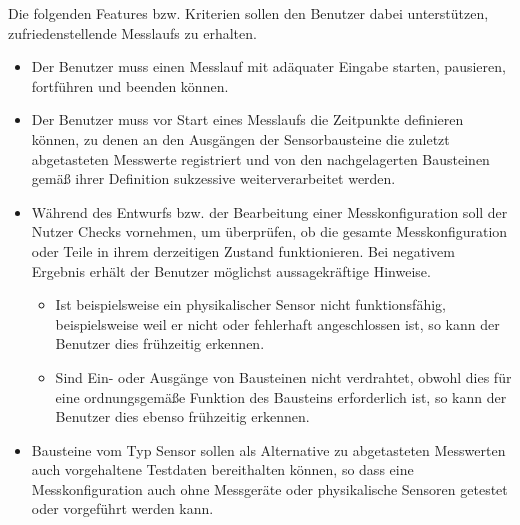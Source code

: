 \documentclass[parskip=full]{scrartcl}
\begin{document}
Die folgenden Features bzw. Kriterien sollen den Benutzer dabei unterstützen, zufriedenstellende \glspl{Messlauf} zu erhalten.


\begin{itemize}
	
	\item 
	\begin{MussKrit} 			
		Der Benutzer muss einen Messlauf mit adäquater Eingabe starten, pausieren, fortführen und beenden können. 
	\end{MussKrit}
	
	\item 
	\begin{MussKrit} 	
		Der Benutzer muss vor Start eines Messlaufs die Zeitpunkte definieren können, zu denen an den Ausgängen der Sensorbausteine die zuletzt abgetasteten Messwerte registriert und von den nachgelagerten Bausteinen gemäß ihrer Definition sukzessive weiterverarbeitet werden.		
	\end{MussKrit}
	
	\item 
	\begin{SollKrit} 
		Während des Entwurfs bzw. der Bearbeitung einer Messkonfiguration soll der Nutzer Checks vornehmen, um überprüfen, ob die gesamte Messkonfiguration oder Teile in ihrem derzeitigen Zustand funktionieren. Bei negativem Ergebnis erhält der Benutzer möglichst aussagekräftige Hinweise. 
 
	
		\begin{itemize}
			
			\item Ist beispielsweise ein physikalischer Sensor nicht funktionsfähig, beispielsweise weil er nicht oder fehlerhaft angeschlossen ist, so kann der Benutzer dies frühzeitig erkennen.
			
			\item Sind Ein- oder Ausgänge von Bausteinen nicht verdrahtet, obwohl dies für  eine ordnungsgemäße Funktion des Bausteins erforderlich ist, so kann der Benutzer dies ebenso frühzeitig erkennen.
			
		\end{itemize}
	\end{SollKrit}
	
	
	\item 
	\begin{WunschKrit} 			
		Bausteine vom Typ Sensor sollen als Alternative zu abgetasteten Messwerten auch vorgehaltene Testdaten bereithalten können, so dass eine Messkonfiguration auch ohne Messgeräte oder physikalische Sensoren getestet oder vorgeführt werden kann.
	\end{WunschKrit}	
	

\end{itemize}
\end{document}
